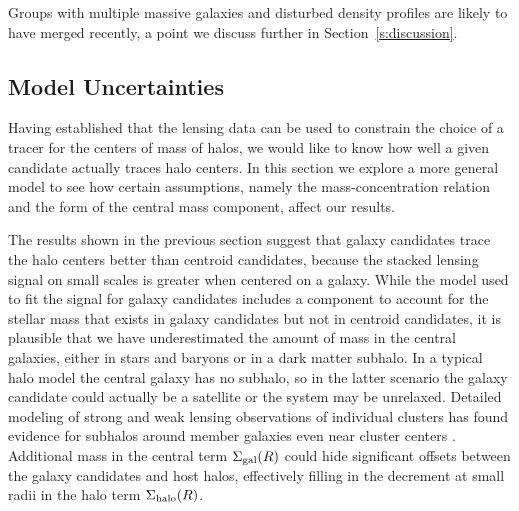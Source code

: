 \documentclass[12pt]{emulateapj}
\begin{document}
Groups with multiple massive galaxies and disturbed
density profiles are likely to have merged recently, a point we
discuss further in Section~\ref{s:discussion}.

\subsection{Model Uncertainties}
\label{s:model_unc}

Having established that the lensing data can be used to
constrain the choice of a tracer for the centers of mass of halos, we would like to
know how well a given candidate actually traces halo centers. In this
section we explore a more general model to see how certain
assumptions, namely the mass-concentration relation and the form of
the central mass component, affect our results.

The results shown in the previous section suggest that galaxy
candidates trace the halo centers better than centroid candidates,
because the stacked lensing signal on small scales is greater when
centered on a galaxy. While the model used to fit the signal for
galaxy candidates includes a component to account for the stellar mass
that exists in galaxy candidates but not in centroid candidates, it is
plausible that we have underestimated the amount of mass in the
central galaxies, either in stars and baryons or in a dark matter
subhalo. In a typical halo model the central galaxy has no
subhalo, so in the latter scenario the galaxy candidate could actually be a
satellite or the system may be unrelaxed.
Detailed modeling of strong and weak lensing observations of
individual clusters has found evidence for subhalos around member
galaxies even near cluster centers \citep{Natarajan2007,
  Natarajan2009}. Additional mass in the central term $\Sigma_{\rm
  gal}(R)$ could hide 
significant offsets between the galaxy candidates and host halos,
effectively filling in the decrement at small radii in the halo term
$\Sigma_{\rm halo}(R)$.
\end{document}
